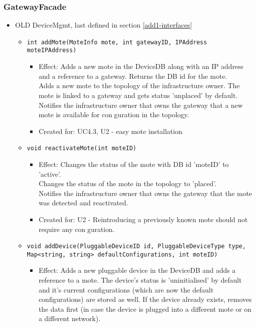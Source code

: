 {{{    \subsubsection{GatewayFacade}
        \begin{itemize}
            \item OLD DeviceMgmt, last defined in section \ref{add1-interfaces}
            \begin{itemize}
                \item \texttt{int addMote(MoteInfo mote, int gatewayID, IPAddress moteIPAddress)}
                    \begin{itemize}
                        \item Effect: Adds a new mote in the DeviceDB along with an IP address and a reference to a gateway. Returns the DB id for the mote. \\
                              Adds a new mote to the topology of the infrastructure owner. The mote is linked to a gateway and gets status 'unplaced' by default. \\
                              Notifies the infrastructure owner that owns the gateway that a new mote is available for conguration in the topology.
                        \item Created for: UC4.3, U2 - easy mote installation
                    \end{itemize}
                \item \texttt{void reactivateMote(int moteID)}
                    \begin{itemize}
                        \item Effect: Changes the status of the mote with DB id 'moteID' to 'active'. \\
                              Changes the status of the mote in the topology to 'placed'. \\
                              Notifies the infrastructure owner that owns the gateway that the mote was detected and reactivated.
                        \item Created for: U2 - Reintroducing a previously known mote should not require any conguration.
                    \end{itemize}
                \item \texttt{void addDevice(PluggableDeviceID id, PluggableDeviceType type, Map<string, string> defaultConfigurations, int moteID)}
                    \begin{itemize}
                        \item Effect: Adds a new pluggable device in the DeviceDB and adds a reference to a mote. The device's status is 'uninitialised' by default and it's current configurations (which are now the default configurations) are stored as well. If the device already exists, removes the data first (in case the device is plugged into a different mote or on a different network). \\

\end{itemize}
\end{itemize}
\end{itemize}}}}
